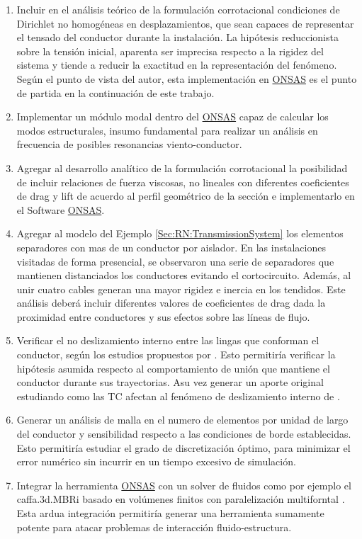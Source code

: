 \begin{enumerate}
	\item Incluir en el análisis teórico de la formulación corrotacional condiciones de Dirichlet no homogéneas en desplazamientos, que sean capaces de  representar el tensado del conductor durante la instalación. La hipótesis reduccionista sobre la tensión inicial, aparenta ser imprecisa respecto a la rigidez del sistema y tiende a reducir la exactitud en la representación del fenómeno. Según el punto de vista del autor, esta implementación en \href{https://github.com/ONSAS/ONSAS/}{ONSAS} es el punto de partida en la continuación de este trabajo. 
	\item Implementar un módulo modal dentro del \href{https://github.com/ONSAS/ONSAS/}{ONSAS} capaz de calcular los modos estructurales, insumo fundamental para realizar un análisis en frecuencia de posibles resonancias viento-conductor.
	\item Agregar al desarrollo analítico de la formulación corrotacional la posibilidad de incluir relaciones de fuerza viscosas, no lineales con diferentes coeficientes de drag y lift de acuerdo al perfil geométrico de la sección e implementarlo en el Software  \href{https://github.com/ONSAS/ONSAS/}{ONSAS}.
	\item Agregar al modelo del Ejemplo \ref{Sec:RN:TransmissionSystem} los elementos separadores con mas de un conductor por aislador. En las instalaciones visitadas de forma presencial, se observaron una serie de separadores que mantienen distanciados los conductores evitando el cortocircuito. Además, al unir cuatro cables generan una mayor rigidez e inercia en los tendidos. Este análisis deberá incluir diferentes valores de coeficientes de drag dada la proximidad entre conductores y sus efectos sobre las líneas de flujo.  
	\item Verificar el no deslizamiento interno entre las lingas que conforman el conductor, según los estudios propuestos por \cite{Foti2016}. Esto permitiría verificar la hipótesis asumida respecto al comportamiento de unión que mantiene el conductor durante sus trayectorias. Asu vez generar un aporte original estudiando como las TC afectan al fenómeno de deslizamiento interno de \cite{Papailiou1997}. 
	\item Generar un análisis de malla en el numero de elementos por unidad de largo del conductor y sensibilidad respecto a las condiciones de borde establecidas. Esto permitiría estudiar el grado de discretización óptimo, para minimizar el error numérico sin incurrir en un tiempo excesivo de simulación. 
	\item Integrar la herramienta \href{https://github.com/ONSAS/ONSAS/}{ONSAS} con un solver de fluidos como por ejemplo el caffa.3d.MBRi basado en volúmenes finitos con paralelización multiforntal \cite{mendina2014general}. Esta ardua integración permitiría generar una herramienta sumamente potente para atacar problemas de interacción fluido-estructura.	
\end{enumerate}

